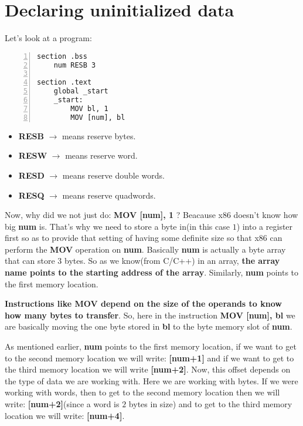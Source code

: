 \documentclass{article}
\makeatletter
\renewcommand\paragraph{\@startsection{paragraph}{4}{\z@}{-3.25ex \@plus -1ex \@minus -.2ex}{1.5ex \@plus .2ex}{\normalfont\normalsize\bfseries}}
\makeatother
\begin{document}
\section{Declaring uninitialized data}\label{sec:first}
\paragraph{}
Let's look at a program:
\begin{Verbatim}[numbers=left, frame=single]
section .bss
	num RESB 3

section .text
	global _start
	_start:
		MOV bl, 1
		MOV [num], bl
\end{Verbatim}
\begin{itemize}
\item \textbf{RESB} $\rightarrow$ means reserve bytes.
\item \textbf{RESW} $\rightarrow$ means reserve word.
\item \textbf{RESD} $\rightarrow$ means reserve double words.
\item \textbf{RESQ} $\rightarrow$ means reserve quadwords.
\end{itemize}
Now, why did we not just do: \textbf{MOV [num], 1} ? Beacause x86 doesn't know how big \textbf{num} is. That's why we need to store a byte in(in this case $1$) into a register first so as to provide that setting of having some definite size so that x86 can perform the \textbf{MOV} operation on \textbf{num}. Basically \textbf{num} is actually a byte array that can store $3$ bytes. So as we know(from C/C++) in an array, \textbf{the array name points to the starting address of the array}. Similarly, \textbf{num} points to the first memory location.

\textbf{Instructions like MOV depend on the size of the operands to know how many bytes to transfer}. So, here in the instruction \textbf{MOV [num], bl} we are basically moving the one byte stored in \textbf{bl} to the byte memory slot of \textbf{num}.

As mentioned earlier, \textbf{num} points to the first memory location, if we want to get to the second memory location we will write: \textbf{[num+1]} and if we want to get to the third memory location we will write \textbf{[num+2]}. Now, this offset depends on the type of data we are working with. Here we are working with bytes. If we were working with words, then to get to the second memory location then we will write: \textbf{[num+2]}(since a word is $2$ bytes in size) and to get to the third memory location we will write: \textbf{[num+4]}.
\end{document}
